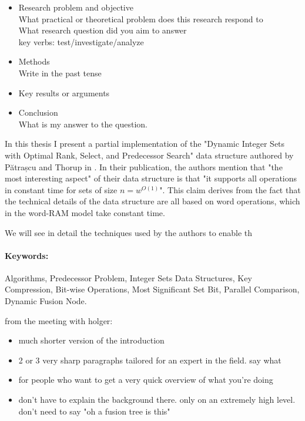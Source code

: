

\begin{itemize}
    \item
    Research problem and objective\\
    What practical or theoretical problem does this research respond to\\
    What research question did you aim to answer\\
    key verbs: test/investigate/analyze\\
    \item
    Methods\\
    Write in the past tense
    \item
    Key results or arguments
    \item
    Conclusion\\
    What is my answer to the question.
\end{itemize}

In this thesis I present a partial implementation of the "Dynamic Integer Sets with Optimal Rank, Select, and Predecessor Search" data structure authored by Pătrașcu and Thorup in \cite{patrascu2014dynamic}. In their publication, the authors mention that "the most interesting aspect" of their data structure is that "it supports all operations in constant time for sets of size $n = w^{O(1)}$". This claim derives from the fact that the technical details of the data structure are all based on word operations, which in the word-RAM model take constant time.

We will see in detail the techniques used by the authors to enable th

\paragraph*{Keywords:} Algorithms, Predecessor Problem, Integer Sets Data Structures, Key Compression, Bit-wise Operations, Most Significant Set Bit, Parallel Comparison, Dynamic Fusion Node.

from the meeting with holger:
\begin{itemize}
    \item
    much shorter version of the introduction
    
    \item
    2 or 3 very sharp paragraphs tailored for an expert in the field. say what 
    
    \item
    for people who want to get a very quick overview of what you're doing
    
    \item
    don't have to explain the background there. only on an extremely high level. don't need to say "oh a fusion tree is this"
\end{itemize}